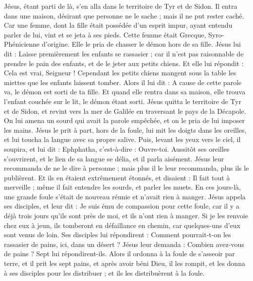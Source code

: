 \begin{multicols}{2}
Jésus, étant parti de là, s'en alla dans le territoire de Tyr et de Sidon. Il entra dans une maison, désirant que personne ne le sache ; mais il ne put rester caché.
Car une femme, dont la fille était possédée d'un esprit impur, ayant entendu parler de lui, vint et se jeta à ses pieds.
Cette femme était Grecque, Syro-Phénicienne d’origine. Elle le pria de chasser le démon hors de sa fille. Jésus lui dit :
Laisse premièrement les enfants se rassasier ; car il n'est pas raisonnable de prendre le pain des enfants, et de le jeter aux petits chiens.
Et elle lui répondit : Cela est vrai, Seigneur ! Cependant les petits chiens mangent sous la table les miettes que les enfants laissent tomber.
Alors il lui dit : A cause de cette parole va, le démon est sorti de ta fille.
Et quand elle rentra dans sa maison, elle trouva l’enfant couchée sur le lit, le démon étant sorti.
Jésus quitta le territoire de Tyr et de Sidon, et revint vers la mer de Galilée en traversant le pays de la Décapole.
On lui amena un sourd qui avait la parole empêchée, et on le pria de lui imposer les mains.
Jésus le prit à part, hors de la foule, lui mit les doigts dans les oreilles, et lui toucha la langue avec sa propre salive.
Puis, levant les yeux vers le ciel, il soupira, et lui dit : Ephphatha, c'est-à-dire : Ouvre-toi.
Aussitôt ses oreilles s'ouvrirent, et le lien de sa langue se délia, et il parla aisément.
Jésus leur recommanda de ne le dire à personne ; mais plus il le leur recommanda, plus ils le publièrent.
Et ils en étaient extrêmement étonnés, et disaient : Il fait tout à merveille ; même il fait entendre les sourds, et parler les muets.
\VerseOne{}En ces jours-là, une grande foule s’était de nouveau réunie et n’avait rien à manger. Jésus appela ses disciples, et leur dit :
Je suis ému de compassion pour cette foule, car il y a déjà trois jours qu'ils sont près de moi, et ils n'ont rien à manger.
Si je les renvoie chez eux à jeun, ils tomberont en défaillance en chemin, car quelques-uns d'eux sont venus de loin.
Ses disciples lui répondirent : Comment pourrait-t-on les rassasier de pains, ici, dans un désert ?
Jésus leur demanda : Combien avez-vous de pains ? Sept lui répondirent-ils.
Alors il ordonna à la foule de s'asseoir par terre, et il prit les sept pains, et après avoir béni Dieu, il les rompit, et les donna à ses disciples pour les distribuer ; et ils les distribuèrent à la foule.

\end{multicols}
